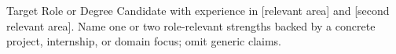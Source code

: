 

\begin{cvparagraph}

Target Role or Degree Candidate with experience in [relevant area] and [second relevant area].
Name one or two role-relevant strengths backed by a concrete project, internship, or domain focus; omit generic claims.

\end{cvparagraph}
